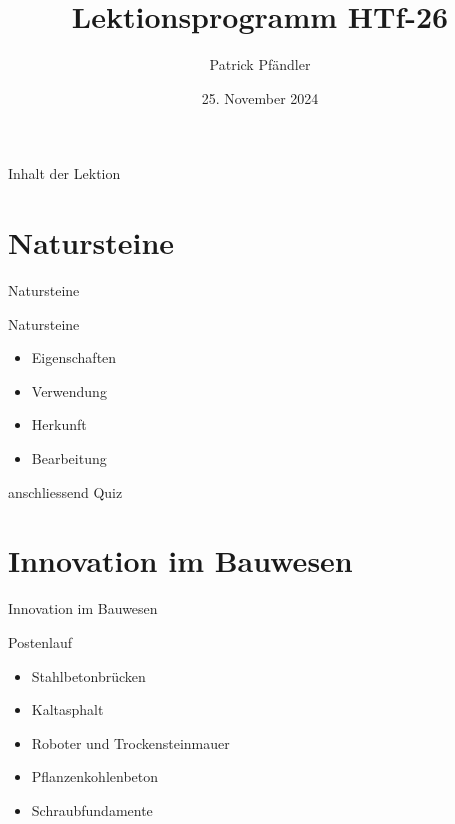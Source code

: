    

    \title{\textbf{Lektionsprogramm HTf-26}}
    \author{Patrick Pfändler}
    \date{25. November 2024}


    

    \frame{\titlepage}

    \begin{frame}{Inhalt der Lektion}
        \tableofcontents
    \end{frame}


    \section{Natursteine}
    \begin{frame}{Natursteine}
        \begin{block}{Natursteine}
            \begin{itemize}
                \item Eigenschaften
                \item Verwendung
                \item Herkunft
                \item Bearbeitung
            \end{itemize}
        \end{block}
        anschliessend Quiz
    \end{frame}


    \section{Innovation im Bauwesen}
    \begin{frame}{Innovation im Bauwesen}
        \begin{block}{Postenlauf}
            \begin{itemize}
                \item [\textbullet] Stahlbetonbrücken
                \item [\textbullet] Kaltasphalt
                \item [\textbullet] Roboter und Trockensteinmauer
                \item [\textbullet] Pflanzenkohlenbeton
                \item [\textbullet] Schraubfundamente
            \end{itemize}
        \end{block}
    \end{frame}


